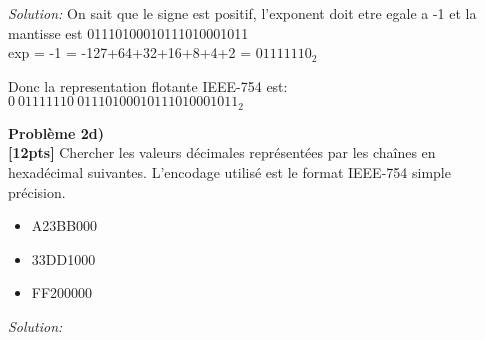 \documentclass{article}
\newenvironment{problem}[2][Problème]
    { \begin{mdframed}[backgroundcolor=gray!20] \textbf{#1 #2} \\}
    {  \end{mdframed}}
\newenvironment{solution}
    {\textit{Solution:}}
    {}
\begin{document}
\begin{solution}
    On sait que le signe est positif, l'exponent doit etre egale a -1 et la mantisse est 01110100010111010001011\\

    exp = -1 = -127+64+32+16+8+4+2 = $01111110_2$

    Donc la representation flotante IEEE-754 est: \\
    $0\ 01111110\ 01110100010111010001011_2$ 
\end{solution}


\begin{problem}{2d)}
\textbf{[12pts]} Chercher les valeurs décimales représentées par les chaînes en hexadécimal
suivantes. L’encodage utilisé est le format IEEE-754 simple précision.
\begin{itemize}
    \item A23BB000
    \item 33DD1000
    \item FF200000
\end{itemize}
\end{problem}

\begin{solution}
\end{solution}
\end{document}
